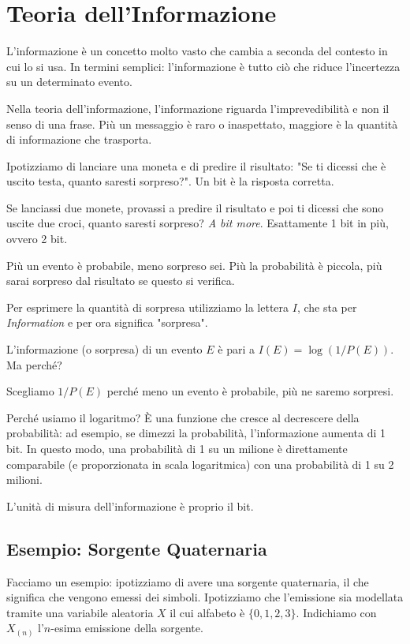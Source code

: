 \section{Teoria dell'Informazione}

L'informazione è un concetto molto vasto che cambia a seconda del contesto in cui lo si usa. In termini semplici: l'informazione è tutto ciò che riduce l'incertezza su un determinato evento.

Nella teoria dell'informazione, l'informazione riguarda l'imprevedibilità e non il senso di una frase. Più un messaggio è raro o inaspettato, maggiore è la quantità di informazione che trasporta.

Ipotizziamo di lanciare una moneta e di predire il risultato: "Se ti dicessi che è uscito testa, quanto saresti sorpreso?". Un bit è la risposta corretta.

Se lanciassi due monete, provassi a predire il risultato e poi ti dicessi che sono uscite due croci, quanto saresti sorpreso? \textit{A bit more}. Esattamente 1 bit in più, ovvero 2 bit.

Più un evento è probabile, meno sorpreso sei. Più la probabilità è piccola, più sarai sorpreso dal risultato se questo si verifica.

Per esprimere la quantità di sorpresa utilizziamo la lettera $I$, che sta per \textit{Information} e per ora significa "sorpresa".

L'informazione (o sorpresa) di un evento $E$ è pari a $I(E) = \log(1/P(E))$. Ma perché?

Scegliamo $1/P(E)$ perché meno un evento è probabile, più ne saremo sorpresi.

Perché usiamo il logaritmo? È una funzione che cresce al decrescere della probabilità: ad esempio, se dimezzi la probabilità, l'informazione aumenta di 1 bit. In questo modo, una probabilità di 1 su un milione è direttamente comparabile (e proporzionata in scala logaritmica) con una probabilità di 1 su 2 milioni.

L'unità di misura dell'informazione è proprio il bit.

\subsection{Esempio: Sorgente Quaternaria}

Facciamo un esempio: ipotizziamo di avere una sorgente quaternaria, il che significa che vengono emessi dei simboli. Ipotizziamo che l'emissione sia modellata tramite una variabile aleatoria $X$ il cui alfabeto è $\{0, 1, 2, 3\}$. Indichiamo con $X_{(n)}$ l'$n$-esima emissione della sorgente.


